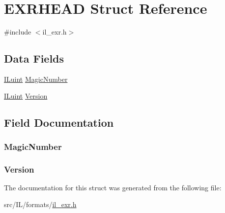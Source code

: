 \hypertarget{struct_e_x_r_h_e_a_d}{\section{E\-X\-R\-H\-E\-A\-D Struct Reference}
\label{struct_e_x_r_h_e_a_d}
}


{\ttfamily \#include $<$il\-\_\-exr.\-h$>$}

\subsection*{Data Fields}
\begin{DoxyCompactItemize}
\item 
\hyperlink{il_8h_ac6508d0e9c19e32f32e00d54b5b8cf30}{I\-Luint} \hyperlink{struct_e_x_r_h_e_a_d_a6067c2377443ff227cbcd5d99a607e65}{Magic\-Number}
\item 
\hyperlink{il_8h_ac6508d0e9c19e32f32e00d54b5b8cf30}{I\-Luint} \hyperlink{struct_e_x_r_h_e_a_d_ace8731875025335038f754ff027b835a}{Version}
\end{DoxyCompactItemize}


\subsection{Field Documentation}
\hypertarget{struct_e_x_r_h_e_a_d_a6067c2377443ff227cbcd5d99a607e65}{
\subsubsection[{Magic\-Number}]{ Magic\-Number}}\label{struct_e_x_r_h_e_a_d_a6067c2377443ff227cbcd5d99a607e65}
\hypertarget{struct_e_x_r_h_e_a_d_ace8731875025335038f754ff027b835a}{
\subsubsection[{Version}]{ Version}}\label{struct_e_x_r_h_e_a_d_ace8731875025335038f754ff027b835a}


The documentation for this struct was generated from the following file\-:\begin{DoxyCompactItemize}
\item 
src/\-I\-L/formats/\hyperlink{il__exr_8h}{il\-\_\-exr.\-h}\end{DoxyCompactItemize}

